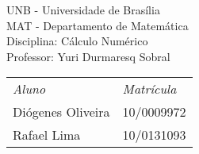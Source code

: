 \newpage
\begin{flushleft}
    {UNB - Universidade de Brasília\\}
    {MAT - Departamento de Matemática\\}
    {Disciplina: Cálculo Numérico\\}
    {Professor: Yuri Durmaresq Sobral\\}
\end{flushleft}
      \vspace{6.0cm}
      \begin{center}
      {\Huge \tituloCapa}
      \end{center}
      \vspace{8.0cm}
      
 \begin{tabular}{ll}
 \textit{Aluno} & \textit{Matrícula}\\
 Diógenes Oliveira & 10/0009972\\
 Rafael Lima & 10/0131093\\
 \end{tabular}

